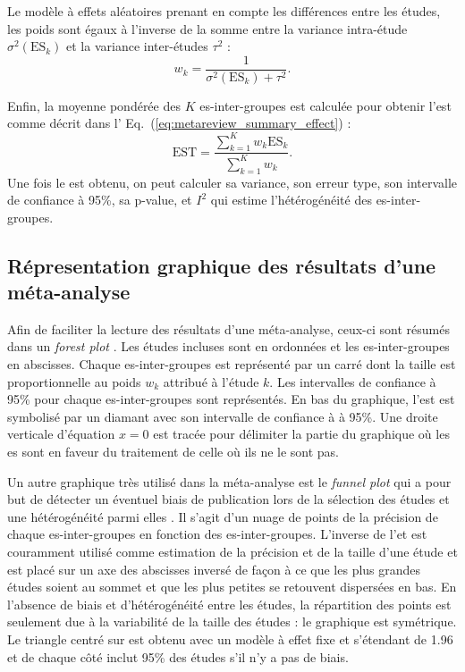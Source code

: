 Le modèle à effets aléatoires prenant en compte les différences entre les études, les poids sont égaux à l'inverse de la somme entre la variance intra-étude
$\sigma^2(\text{ES}_k)$ et la variance inter-études $\tau^2$ \citep{Borenstein2009} :
\begin{equation}
\label{eq:metareview_weight_study}
w_k = \frac{1}{\sigma^2(\text{ES}_k) + \tau^2}.
\end{equation} 

Enfin, la moyenne pondérée des $K$ \gls{es}-inter-groupes est calculée pour obtenir l'\gls{est} comme décrit dans l' 
Eq.~(\ref{eq:metareview_summary_effect}) \citep{Borenstein2009}:
\begin{equation}
\label{eq:metareview_summary_effect}
\text{EST} = \frac{\sum_{k=1}^{K} w_k \text{ES}_k} {\sum_{k=1}^{K} w_k}.
\end{equation} 
Une fois le \gls{est} obtenu, on peut calculer sa variance, son erreur type, son intervalle de confiance à 95\%, sa p-value, 
et $I^2$ qui estime l'hétérogénéité des \gls{es}-inter-groupes. 

\subsection{Répresentation graphique des résultats d'une méta-analyse}

Afin de faciliter la lecture des résultats d'une méta-analyse, ceux-ci sont résumés dans un \textit{forest plot} \citep{Borenstein2009}. Les études incluses sont
en ordonnées et les \gls{es}-inter-groupes en abscisses. Chaque \gls{es}-inter-groupes est représenté par un carré dont la taille est proportionnelle
au poids $w_k$ attribué à l'étude $k$. Les intervalles de confiance à 95\% pour chaque \gls{es}-inter-groupes sont représentés. En bas du graphique, l'\gls{est}
est symbolisé par un diamant avec son intervalle de confiance à à 95\%. Une droite verticale d'équation $x = 0$ est tracée pour délimiter la
partie du graphique où les \gls{es} sont en faveur du traitement de celle où ils ne le sont pas.

Un autre graphique très utilisé dans la méta-analyse est le \textit{funnel plot} qui a pour but de détecter un éventuel biais de publication
lors de la sélection des études et une hétérogénéité parmi elles \citep{Sterne2011}. Il s'agit d'un nuage de points de la précision de chaque 
\gls{es}-inter-groupes en fonction des \gls{es}-inter-groupes. L'inverse de l'\gls{et} est couramment utilisé comme estimation de la précision et de la 
taille d'une étude et est placé sur un axe des abscisses inversé de façon à ce que les plus grandes études soient au sommet et que les plus petites se retouvent 
dispersées en bas. En l'absence de biais et d'hétérogénéité entre les études, la répartition des points est seulement due à la variabilité de la taille des études : 
le graphique est symétrique. Le triangle centré sur \gls{est} obtenu avec un modèle à effet fixe et s'étendant de 1.96 \gls{et} de chaque côté 
inclut 95\% des études s'il n'y a pas de biais.

